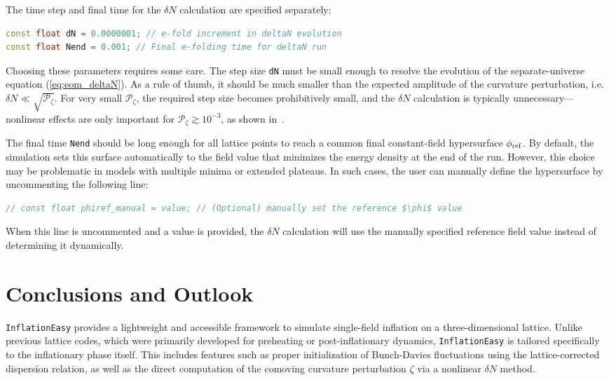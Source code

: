 \documentclass[aps, nofootinbib,superscriptaddress, preprintnumbers, longbibliography]{article}
\begin{document}
The time step and final time for the $\delta N$ calculation are specified separately:
\begin{lstlisting}[language=C++, firstnumber=66,caption={}]
const float dN = 0.0000001; // e-fold increment in deltaN evolution
const float Nend = 0.001; // Final e-folding time for deltaN run
\end{lstlisting}
Choosing these parameters requires some care. The step size \texttt{dN} must be small enough to resolve the evolution of the separate-universe equation (\cref{eq:eom_deltaN}). As a rule of thumb, it should be much smaller than the expected amplitude of the curvature perturbation, i.e. $\delta N \ll \sqrt{\mathcal{P}_{\zeta}}$. For very small $\mathcal{P}_{\zeta}$, the required step size becomes prohibitively small, and the $\delta N$ calculation is typically unnecessary—nonlinear effects are only important for $\mathcal{P}_{\zeta} \gtrsim 10^{-3}$, as shown in~\cite{USR2}.

The final time \texttt{Nend} should be long enough for all lattice points to reach a common final constant-field hypersurface $\phi_{\rm ref}$. By default, the simulation sets this surface automatically to the field value that minimizes the energy density at the end of the run. However, this choice may be problematic in models with multiple minima or extended plateaus. In such cases, the user can manually define the hypersurface by uncommenting the following line:
\begin{lstlisting}[language=C++, firstnumber=68,caption={}]
// const float phiref_manual = value; // (Optional) manually set the reference $\phi$ value
\end{lstlisting}
When this line is uncommented and a value is provided, the $\delta N$ calculation will use the manually specified reference field value instead of determining it dynamically.


\section{Conclusions and Outlook}
\label{sec:conclusions}

\texttt{InflationEasy} provides a lightweight and accessible framework to simulate single-field inflation on a three-dimensional lattice. Unlike previous lattice codes, which were primarily developed for preheating or post-inflationary dynamics, \texttt{InflationEasy} is tailored specifically to the inflationary phase itself. This includes features such as proper initialization of Bunch-Davies fluctuations using the lattice-corrected dispersion relation, as well as the direct computation of the comoving curvature perturbation $\zeta$ via a nonlinear $\delta N$ method.
\end{document}
